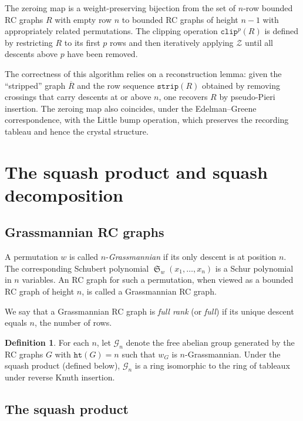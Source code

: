 \documentclass{amsart}
\theoremstyle{definition}
\newtheorem{definition}[lemma]{Definition}
\theoremstyle{remark}
\numberwithin{equation}{section}
\DeclareMathOperator{\sch}{\mathfrak{S}}
\newcommand{\grass}{\mathcal{G}}
\newcommand{\wof}[1]{w_{#1}}
\newcommand{\hr}{\mathtt{ht}}
\newcommand{\zeromap}{\mathcal{Z}}
\begin{document}
The zeroing map is a weight-preserving bijection from the set of $n$-row bounded RC graphs $R$ with empty row $n$ to bounded RC graphs of height $n - 1$ with appropriately related permutations.  The clipping operation $\mathtt{clip}^p(R)$ is defined by restricting $R$ to its first $p$ rows and then iteratively applying $\zeromap$ until all descents above $p$ have been removed.

The correctness of this algorithm relies on a reconstruction lemma: given the ``stripped'' graph $\overline{R}$ and the row sequence $\mathtt{strip}(R)$ obtained by removing crossings that carry descents at or above $n$, one recovers $R$ by pseudo-Pieri insertion.  The zeroing map also coincides, under the Edelman--Greene correspondence, with the Little bump operation, which preserves the recording tableau and hence the crystal structure.




\section{The squash product and squash decomposition}\label{section:squash}

\subsection{Grassmannian RC graphs}

A permutation $w$ is called $n$-\textit{Grassmannian} if its only descent is at position $n$.  The corresponding Schubert polynomial $\sch_w(x_1, \ldots, x_n)$ is a Schur polynomial in $n$ variables.  An RC graph for such a permutation, when viewed as a bounded RC graph of height $n$, is called a Grassmannian RC graph.

We say that a Grassmannian RC graph is \textit{full rank} (or \textit{full}) if its unique descent equals $n$, the number of rows.

\begin{definition}\label{definition:grassring}
For each $n$, let $\grass_n$ denote the free abelian group generated by the RC graphs $G$ with $\hr(G) = n$ such that $\wof{G}$ is $n$-Grassmannian.  Under the squash product (defined below), $\grass_n$ is a ring isomorphic to the ring of tableaux under reverse Knuth insertion.
\end{definition}

\subsection{The squash product}
\end{document}
